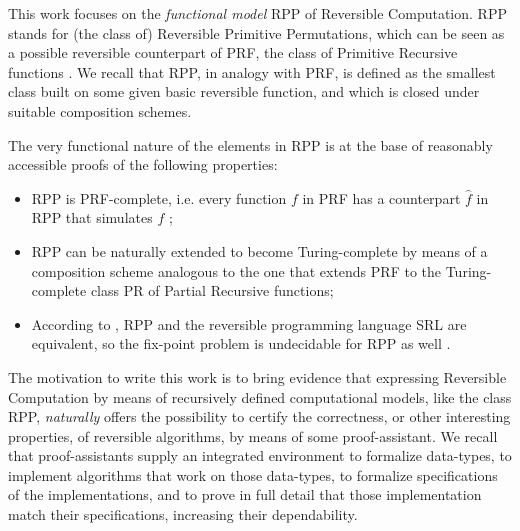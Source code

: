 \documentclass[runningheads]{llncs}
\newcommand{\RPP}{\textsf{RPP}\xspace}
\newcommand{\PRF}{\textsf{PRF}\xspace}
\newcommand{\PR}{\textsf{PR}\xspace}
\newcommand{\SRL}{\textsf{SRL}\xspace}
\begin{document}
This work focuses on the \emph{functional model} \RPP \cite{DBLP:journals/tcs/PaoliniPR20} of Reversible Computation.
\RPP stands for (the class of) Reversible Primitive Permutations, which can be seen as a possible reversible counterpart of \PRF, the class of Primitive Recursive functions \cite{rogers1967theory}.
We recall that \RPP, in analogy with \PRF, is defined as the smallest class built on some given basic reversible function,
and which is closed under suitable composition schemes.

The very functional nature of the elements in \RPP is at the base of reasonably accessible proofs of the following properties:
\begin{itemize}
\item \RPP is \PRF-complete, i.e. every function $ f $ in \PRF has a counterpart $ \hat{f} $ in \RPP that simulates $ f $ \cite{DBLP:journals/tcs/PaoliniPR20};

\item \RPP can be naturally extended to become Turing-complete \cite{Paolini2018NGC} by means of a composition scheme analogous to the one that extends \PRF to the Turing-complete class \PR of Partial Recursive functions;

\item According to \cite{MatosRC2020}, \RPP and the reversible programming language \SRL \cite{matos03tcs} are equivalent, so the fix-point problem is undecidable for \RPP as well \cite{2318_1734164MatosPaoliniRoversiTCSICTCS18}.
\end{itemize}

The motivation to write this work is to bring evidence that expressing Reversible Computation by means of recursively defined computational models, like the class \RPP, \emph{naturally} offers the possibility to certify the correctness, or other interesting properties, of reversible algorithms, by means of some proof-assistant.
We recall that proof-assistants supply an integrated environment to formalize data-types, to implement algorithms that work on those data-types, to formalize specifications of the implementations, and to prove in full detail that those implementation match their specifications, increasing their dependability.

\end{document}
